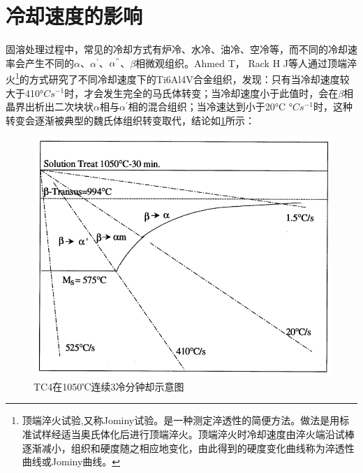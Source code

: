 \documentclass[
class = book,
zihao = -4,
font = noto,
paper = a4paper,
openany
]{easybook}
\newcommand{\ti}{Ti6Al4V}
\begin{document}
\section{冷却速度的影响}
固溶处理过程中，常见的冷却方式有炉冷、水冷、油冷、空冷等，而不同的冷却速率会产生不同的$ \alpha  $、$ \alpha  ^{'}$、$ \alpha  ^{"}$、$ \beta$相微观组织\cite{malinovModellingCorrelationProcessing2001}。Ahmed T， Rack H J等人通过顶端淬火\footnote{顶端淬火试验,又称Jominy试验。是一种测定淬透性的简便方法。做法是用标准试样经适当奥氏体化后进行顶端淬火。顶端淬火时冷却速度由淬火端沿试棒逐渐减小，组织和硬度随之相应地变化，由此得到的硬度变化曲线称为淬透性曲线或Jominy曲线。}的方式研究\cite{ahmedPhaseTransformationsCooling1998}了不同冷却速度下的\ti 合金组织，发现：只有当冷却速度较大于410°$C  s^{- 1} $时，才会发生完全的马氏体转变；当冷却速度小于此值时，会在$ \beta $相晶界出析出二次块状$\alpha  $相与$ \alpha^{'} $相的混合组织；当冷速达到小于20°C °$C  s^{- 1} $时，这种转变会逐渐被典型的魏氏体组织转变取代，结论如\ref{fig:tc41050c3}所示：
\begin{figure}[h!]
	\centering
	\includegraphics[width=0.7\linewidth]{TC4在1050℃连续3冷分钟却示意图}
	\caption{TC4在1050℃连续3冷分钟却示意图}
	\label{fig:tc41050c3}
\end{figure}
\end{document}
